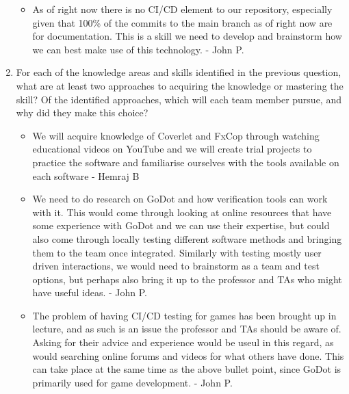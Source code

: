 \documentclass[12pt, titlepage]{article}
\begin{document}
\begin{enumerate}
\begin{itemize}
    \item As of right now there is no CI/CD element to our repository, especially given that 100\% of the commits to the main branch as of right now are for documentation. This is a skill we need to develop and brainstorm how we can best make use of this technology. - John P.
  \end{itemize}
  \item For each of the knowledge areas and skills identified in the previous
  question, what are at least two approaches to acquiring the knowledge or
  mastering the skill?  Of the identified approaches, which will each team
  member pursue, and why did they make this choice?
  \begin{itemize}
    \item We will acquire knowledge of Coverlet and FxCop through watching educational videos on YouTube and we will create trial projects to practice the software and familiarise ourselves with the tools available on each software - Hemraj B
    \item We need to do research on GoDot and how verification tools can work with it. This would come through looking at online resources that have some experience with GoDot and we can use their expertise, but could also come through locally testing different software methods and bringing them to the team once integrated. Similarly with testing mostly user driven interactions, we would need to brainstorm as a team and test options, but perhaps also bring it up to the professor and TAs who might have useful ideas. - John P.
    \item The problem of having CI/CD testing for games has been brought up in lecture, and as such is an issue the professor and TAs should be aware of. Asking for their advice and experience would be useul in this regard, as would searching online forums and videos for what others have done. This can take place at the same time as the above bullet point, since GoDot is primarily used for game development. - John P.
  \end{itemize}
\end{enumerate}
\end{document}
